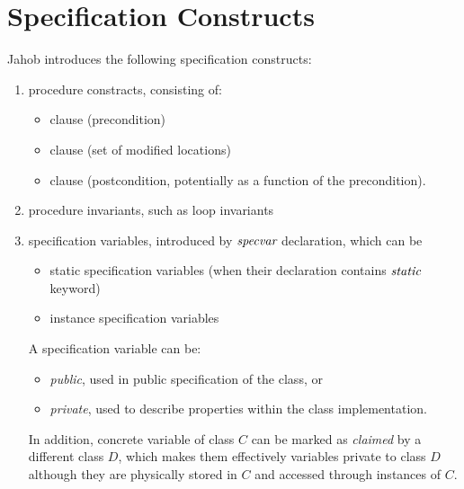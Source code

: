 \section{Specification Constructs}

Jahob introduces the following specification constructs:
\begin{enumerate}
\item procedure constracts, consisting of:
      \begin{itemize}
      \item {} clause (precondition)
      \item {} clause (set of modified locations)
      \item {} clause (postcondition, potentially as a function of the precondition).
      \end{itemize}
\item procedure invariants, such as loop invariants
\item specification variables, introduced by $\textit{specvar}$ declaration, which can be
      \begin{itemize}
      \item static specification variables (when their declaration contains $\textit{static}$ keyword)
      \item instance specification variables
      \end{itemize}
      A specification variable can be:
      \begin{itemize}
      \item \emph{public}, used in public specification of the class, or
      \item \emph{private}, used to describe properties within
      the class implementation.  
      \end{itemize}
      In addition, concrete variable of class $C$ 
      can be marked as \emph{claimed} by a different class $D$,
      which makes them effectively variables private to class $D$ although they
      are physically stored in $C$ and accessed through instances of $C$.


\end{enumerate}
